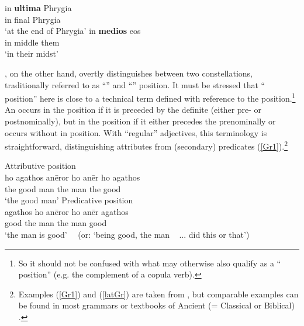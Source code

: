 \documentclass[output=paper,colorlinks,citecolor=brown]{langscibook}
\begin{document}
\begin{multicols}{2}{
\begin{exe} 
   \ex \label{lat2} 
     \begin{xlist}  
         \ex \gll  in \textbf{ultima} Phrygia  \\  
            in final Phrygia    \\ 
            \glt `at the end of Phrygia'  
         \ex \gll  in \textbf{medios} eos  \\ 
            in middle them   \\ 
            \glt `in their midst'  
     \end{xlist}
\end{exe} }
 \end{multicols}  


, on the other hand, overtly distinguishes between two constellations, traditionally referred to as ``'' and  ``'' position. It must be stressed that `` position'' here is close to a technical term defined with reference to the  position.\footnote{So it should not be confused with what may otherwise also qualify as a `` position'' (e.g. the complement of a copula verb). }  
An  occurs in the  position if it is preceded by the definite  (either pre-  or postnominally), but in the  position if it either precedes the  prenominally or occurs without  in  position. With  ``regular'' adjectives, this terminology is straightforward, distinguishing attributes from (secondary) predicates (\ref{Gr1}).\footnote{Examples (\ref{Gr1}) and (\ref{latGr}) are taken from \citet[169--171]{bornegriech}, but comparable examples can be found in most grammars or textbooks of Ancient (= Classical or Biblical) . } 


\begin{exe}
   \ex \label{Gr1}
     \begin{xlist}
         \ex \label{Gr1a}  Attributive position  \\ 
             \gll ho agathos an\={e}r\hspace{14mm}or\hspace{10mm}   ho an\={e}r h{o} agathos  \\ 
               the good man the man the good   \\ 
               \glt `the good man'   
         \ex \label{Gr1b}  Predicative position  \\ 
             \gll  agathos h{o}  an\={e}r\hspace{14mm}or\hspace{10mm}  h{o} an\={e}r agathos   \\  
               good the  man  the  man  good \\
               \glt `the man is good' \ \ (or: `being good, the man \ {\color{gray} ... did this  or that}')
     \end{xlist}
\end{exe} 
\end{document}
